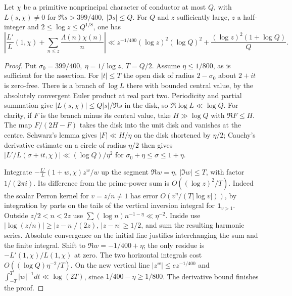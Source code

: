 \begin{lemma}\label{pr:perron}
Let \(\chi\) be a primitive nonprincipal character of conductor at most
\(Q\), with \(L(s,\chi)\ne0\) for \(\Re s>399/400,\ |\Im s|\le Q\).
For \(Q\) and \(z\) sufficiently large, \(z\) a half-integer and
\(2\le\log z\le Q^{1/8}\), one has
\[
 \left|\frac{L'}{L}(1,\chi)+\sum_{n\le z}\frac{\Lambda(n)\chi(n)}n\right|
 \ll z^{-1/400}(\log z)^2(\log Q)^2+
        \frac{(\log z)^2(1+\log Q)}{Q}.
\]
\end{lemma}
\begin{proof}
Put \(\sigma_0=399/400,\ \eta=1/\log z,\ T=Q/2\). Assume
\(\eta\le1/800\), as is sufficient for the assertion. For \(|t|\le T\)
the open disk of radius \(2-\sigma_0\) about \(2+it\) is zero-free.
There is a branch of \(\log L\) there with bounded central value, by
the absolutely convergent Euler product at real part two. Periodicity
and partial summation give \(|L(s,\chi)|\le Q|s|/\Re s\) in the disk,
so \(\Re\log L\ll\log Q\). For clarity, if \(F\) is the branch minus
its central value, take \(H\gg\log Q\) with \(\Re F\le H\).
The map \(F/(2H-F)\) takes the disk into the unit disk and vanishes at
the centre. Schwarz's lemma gives \(|F|\ll H/\eta\) on the disk
shortened by \(\eta/2\); Cauchy's derivative estimate on a circle of
radius \(\eta/2\) then gives
\(|L'/L(\sigma+it,\chi)|\ll(\log Q)/\eta^2\) for
\(\sigma_0+\eta\le\sigma\le1+\eta\).

Integrate \(-\frac{L'}L(1+w,\chi)z^w/w\) up the segment
\(\Re w=\eta,\ |\Im w|\le T\), with factor \(1/(2\pi i)\).
Its difference from the prime-power sum is \(O((\log z)^2/T)\).
Indeed the scalar Perron kernel for \(v=z/n\ne1\) has error
\(O(v^\eta/(T|\log v|))\), by integration by parts on the tails of
the vertical inversion integral for \(\mathbf1_{v>1}\).
Outside \(z/2<n<2z\) use \(\sum(\log n)n^{-1-\eta}\ll\eta^{-2}\).
Inside use \(|\log(z/n)|\ge|z-n|/(2z)\), \(|z-n|\ge1/2\), and sum
the resulting harmonic series. Absolute convergence on the initial
line justifies interchanging the sum and the finite integral.
Shift to \(\Re w=-1/400+\eta\); the only residue is
\(-L'(1,\chi)/L(1,\chi)\) at zero. The two horizontal integrals cost
\(O((\log Q)\eta^{-2}/T)\). On the new vertical line
\(|z^w|\le e z^{-1/400}\) and \(\int_{-T}^T|w|^{-1}dt\ll\log(2T)\),
since \(1/400-\eta\ge1/800\). The derivative bound finishes the proof.
\end{proof}

